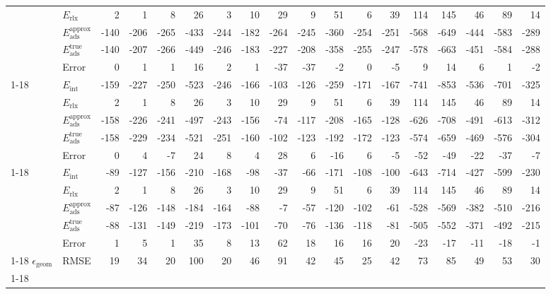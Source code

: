 \begin{longtable}{llrrrrrrrrrrrrrrrr}
 & $E_\text{rlx}$ & 2 & 1 & 8 & 26 & 3 & 10 & 29 & 9 & 51 & 6 & 39 & 114 & 145 & 46 & 89 & 14 \\
 & $E_\text{ads}^\text{approx}$ & -140 & -206 & -265 & -433 & -244 & -182 & -264 & -245 & -360 & -254 & -251 & -568 & -649 & -444 & -583 & -289 \\
 & $E_\text{ads}^\text{true}$ & -140 & -207 & -266 & -449 & -246 & -183 & -227 & -208 & -358 & -255 & -247 & -578 & -663 & -451 & -584 & -288 \\
 & Error & 0 & 1 & 1 & 16 & 2 & 1 & -37 & -37 & -2 & 0 & -5 & 9 & 14 & 6 & 1 & -2 \\
\cline{1-18}
\multirow[]{5}{*}{\rotatebox{90}{PBE0-D4}} & $E_\text{int}$ & -159 & -227 & -250 & -523 & -246 & -166 & -103 & -126 & -259 & -171 & -167 & -741 & -853 & -536 & -701 & -325 \\
 & $E_\text{rlx}$ & 2 & 1 & 8 & 26 & 3 & 10 & 29 & 9 & 51 & 6 & 39 & 114 & 145 & 46 & 89 & 14 \\
 & $E_\text{ads}^\text{approx}$ & -158 & -226 & -241 & -497 & -243 & -156 & -74 & -117 & -208 & -165 & -128 & -626 & -708 & -491 & -613 & -312 \\
 & $E_\text{ads}^\text{true}$ & -158 & -229 & -234 & -521 & -251 & -160 & -102 & -123 & -192 & -172 & -123 & -574 & -659 & -469 & -576 & -304 \\
 & Error & 0 & 4 & -7 & 24 & 8 & 4 & 28 & 6 & -16 & 6 & -5 & -52 & -49 & -22 & -37 & -7 \\
\cline{1-18}
\multirow[]{5}{*}{\rotatebox{90}{B3LYP-D2[Ne]}} & $E_\text{int}$ & -89 & -127 & -156 & -210 & -168 & -98 & -37 & -66 & -171 & -108 & -100 & -643 & -714 & -427 & -599 & -230 \\
 & $E_\text{rlx}$ & 2 & 1 & 8 & 26 & 3 & 10 & 29 & 9 & 51 & 6 & 39 & 114 & 145 & 46 & 89 & 14 \\
 & $E_\text{ads}^\text{approx}$ & -87 & -126 & -148 & -184 & -164 & -88 & -7 & -57 & -120 & -102 & -61 & -528 & -569 & -382 & -510 & -216 \\
 & $E_\text{ads}^\text{true}$ & -88 & -131 & -149 & -219 & -173 & -101 & -70 & -76 & -136 & -118 & -81 & -505 & -552 & -371 & -492 & -215 \\
 & Error & 1 & 5 & 1 & 35 & 8 & 13 & 62 & 18 & 16 & 16 & 20 & -23 & -17 & -11 & -18 & -1 \\
\cline{1-18}
$\epsilon_\text{geom}$ & RMSE & 19 & 34 & 20 & 100 & 20 & 46 & 91 & 42 & 45 & 25 & 42 & 73 & 85 & 49 & 53 & 30 \\
\cline{1-18}
\end{longtable}